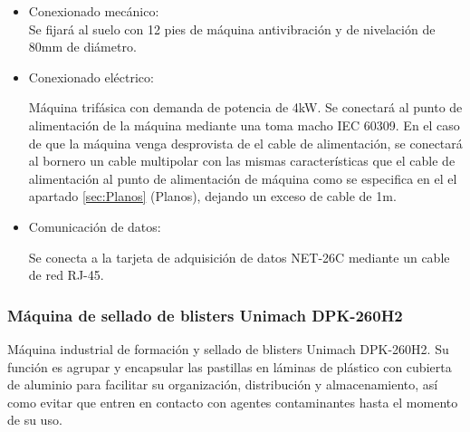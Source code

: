 		\begin{itemize}
				\item{Conexionado mecánico:}\\
				
				Se fijará al suelo con 12 pies de máquina antivibración y de nivelación de 80mm de diámetro.

				\item{Conexionado eléctrico:}

				Máquina trifásica con demanda de potencia de 4kW. Se conectará al punto de alimentación de la máquina mediante una  toma macho IEC 60309. En el caso de que la máquina venga desprovista de el cable de alimentación, se conectará al bornero un cable multipolar con las mismas características que el cable de alimentación al punto de alimentación de máquina como se especifica en el el apartado \ref{sec:Planos} (Planos), dejando un exceso de cable de 1m. \
				
				\item{Comunicación de datos:}

				Se conecta a la tarjeta de adquisición de datos NET-26C mediante un cable de red RJ-45.
		\end{itemize}

    \newpage

	\subsubsection{Máquina de sellado de blisters Unimach DPK-260H2}

	
	Máquina industrial de formación y sellado de blisters Unimach DPK-260H2. Su función es agrupar y encapsular las pastillas en láminas de plástico con cubierta de aluminio para facilitar su organización, distribución y almacenamiento, así como evitar que entren en contacto con agentes contaminantes hasta el momento de su uso.\\


